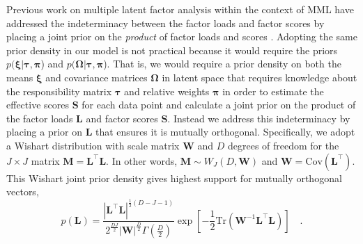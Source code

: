 \documentclass[twocolumn]{aastex62}
\newcommand{\vect}[1]{\boldsymbol{\mathbf{#1}}}
\renewcommand{\vec}[1]{\vect{#1}}
\newcommand{\weight}{\pi}
\newcommand{\transpose}{^\intercal}
\newcommand{\factorloads}{\textbf{L}}
\newcommand{\factorscores}{\textbf{S}}
\newcommand{\scoremeans}{\vec\xi}
\newcommand{\scorecovs}{\vec\Omega}
\newcommand{\NumDimensions}{D}
\newcommand{\NumLatentFactors}{J}
\begin{document}
Previous work on multiple latent factor analysis within the context of MML have
addressed the indeterminacy between the factor loads and factor scores by
placing a joint prior on the \emph{product} of factor loads and scores \citep{WallaceMLF,EdwardsDowe1998,Wallace:2005}.
Adopting the same prior density in our model is not practical because 
it would require the priors $p(\scoremeans|\vec\tau,\vec\weight$) and $p(\scorecovs|\vec\tau,\vec\weight$).
That is, we would require a prior density on both the means $\scoremeans$
and covariance matrices $\scorecovs$ in latent space that requires knowledge
about the responsibility matrix $\vec\tau$ and relative weights $\vec\weight$ in order to estimate the effective scores
$\factorscores$ for each data point and calculate a joint prior on the product
of the factor loads $\factorloads$ and factor scores $\factorscores$.
Instead we address this indeterminacy
by placing a prior on $\factorloads$ that ensures it is mutually orthogonal.
Specifically, we adopt a Wishart distribution with scale matrix $\vec{W}$
and $D$ degrees of freedom for the
$\NumLatentFactors\times\NumLatentFactors$ matrix $\vec{M} = \factorloads\transpose\factorloads$.
In other words, $\vec{M} \sim W_\NumLatentFactors(D,\vec{W})$
and $\vec{W} = \textrm{Cov}(\factorloads\transpose)$.
This
Wishart joint prior density gives highest support for mutually orthogonal vectors,
\begin{equation}
	p(\factorloads) = \frac{|\factorloads\transpose\factorloads|^{\frac{1}{2}(\NumDimensions - \NumLatentFactors - 1)}}{2^{\frac{\NumDimensions\NumLatentFactors}{2}}|\vec{W}|^{\frac{\NumDimensions}{2}}\Gamma(\frac{\NumDimensions}{2})}\exp\left[-\frac{1}{2}\textrm{Tr}(\vec{W}^{-1}\factorloads\transpose\factorloads)\right] \quad .
\end{equation}
\end{document}
